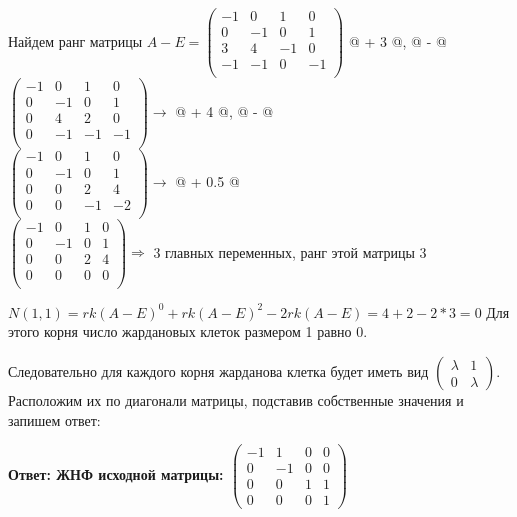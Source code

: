 \documentclass[a4paper,12pt]{article}
\makeatletter
\newcommand*{\rom}[1]{\expandafter\@slowromancap\romannumeral #1@}
\makeatother
\begin{document}
\begin{enumerate}
Найдем ранг матрицы $A-E = \begin{pmatrix}
-1&0&1&0\\
0&-1&0&1\\
3&4&-1&0\\
-1&-1&0&-1\\
\end{pmatrix}$ \rom{3} + 3 \rom{1}, \rom{4} - \rom{1}\\
$
\left(\begin{array}{cccc}  
-1&0&1&0\\
0&-1&0&1\\
0&4&2&0\\
0&-1&-1&-1\\
\end{array}\right) \rightarrow$  \rom{3} + 4 \rom{2}, \rom{4} -  \rom{2}\\
$
\left(\begin{array}{cccc}  
-1&0&1&0\\
0&-1&0&1\\
0&0&2&4\\
0&0&-1&-2\\
\end{array}\right) \rightarrow$  \rom{4} + 0.5 \rom{3}\\
$
\left(\begin{array}{cccc}  
-1&0&1&0\\
0&-1&0&1\\
0&0&2&4\\
0&0&0&0\\
\end{array}\right) \Rightarrow$  3 главных переменных, ранг этой матрицы 3


$N(1,1)=rk(A-E)^0+rk(A-E)^2-2rk(A-E) =4+2-2*3=0$  Для этого корня число жардановых клеток размером 1 равно 0.

Следовательно для каждого корня жарданова клетка будет иметь вид $\begin{pmatrix}
\lambda & 1\\
0& \lambda
\end{pmatrix}$. Расположим их по диагонали матрицы, подставив собственные значения и запишем ответ:

\textbf{Ответ: ЖНФ исходной матрицы: $\begin{pmatrix}
-1 & 1 & 0 & 0\\
0 & -1 & 0 & 0\\
0 & 0 & 1 & 1\\
0 & 0 & 0 & 1
\end{pmatrix}$}


\end{enumerate}
\end{document}
